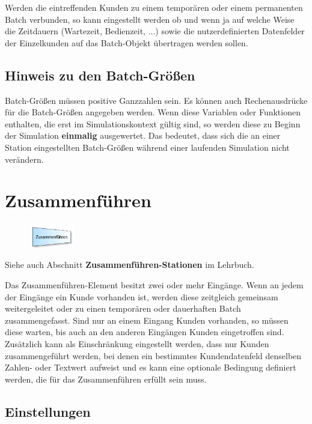 Werden die eintreffenden Kunden zu einem temporären oder einem permanenten Batch verbunden, so kann eingestellt werden
ob und wenn ja auf welche Weise die Zeitdauern (Wartezeit, Bedienzeit, ...) sowie die nutzerdefinierten Datenfelder
der Einzelkunden auf das Batch-Objekt übertragen werden sollen.

\subsection*{Hinweis zu den Batch-Größen}

Batch-Größen müssen positive Ganzzahlen sein.
Es können auch Rechenausdrücke für die Batch-Größen angegeben werden.
Wenn diese Variablen oder Funktionen enthalten, die erst im Simulationskontext gültig sind, so werden diese zu Beginn der Simulation \textbf{einmalig} ausgewertet.
Das bedeutet, dass sich die an einer Station eingestellten Batch-Größen während einer laufenden Simulation nicht verändern.


\section{Zusammenführen}
\label{ref:ModelElementMatch}

\begin{figure}
\vspace{-22pt}
\includegraphics[width=2cm]{imageModelElementMatch.png}
\vspace{-22pt}
\end{figure}

Siehe auch Abschnitt \textbf{Zusammenführen-Stationen} im Lehrbuch.

Das Zusammenführen-Element besitzt zwei oder mehr Eingänge. Wenn an jedem der Eingänge ein Kunde vorhanden ist,
werden diese zeitgleich gemeinsam weitergeleitet oder zu einen temporären oder dauerhaften Batch zusammengefasst.
Sind nur an einem Eingang Kunden vorhanden, so müssen diese warten, bis auch an den anderen Eingängen Kunden eingetroffen sind.
Zusätzlich kann als Einschränkung eingestellt werden, dass nur Kunden zusammengeführt werden, bei denen ein bestimmtes
Kundendatenfeld denselben Zahlen- oder Textwert aufweist und es kann eine optionale Bedingung definiert werden,
die für das Zusammenführen erfüllt sein muss.

\subsection*{Einstellungen}

